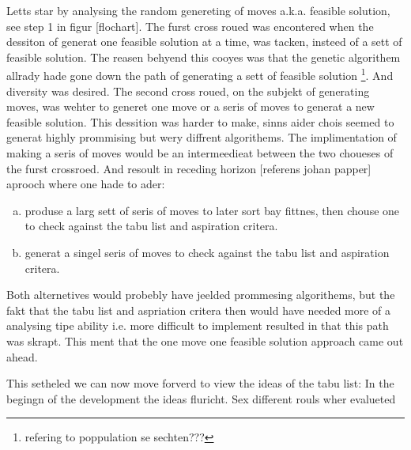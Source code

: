 Letts star by analysing the random genereting of moves a.k.a. feasible solution, see step 1 in figur [flochart].
The furst cross roued was encontered when the dessiton of generat one feasible solution at a time, was tacken, insteed of a sett of feasible solution. The reasen behyend this cooyes was that the genetic algorithem allrady hade gone down the path of generating a sett of feasible solution \footnote{ refering to poppulation se sechten???}. And diversity was desired.
The second cross roued, on the subjekt of generating moves, was wehter to generet one move or a seris of moves to generat a new feasible solution. This dessition was harder to make, sinns aider chois seemed to generat highly prommising but wery diffrent algorithems. The implimentation of making a seris of moves would be an intermeedieat between the two choueses of the furst crossroed. And resoult in receding horizon [referens johan papper] aprooch where one hade to ader: 
\begin{enumerate}[(a)]   
\item produse a larg sett of seris of moves to later sort bay fittnes, then chouse one to check against the tabu list and aspiration critera.
\item generat a singel seris of moves to check against the tabu list and aspiration critera.
\end{enumerate}
Both alternetives would probebly have jeelded prommesing algorithems, but the fakt that the tabu list and aspriation critera then would have needed more of a analysing tipe ability i.e. more difficult to implement resulted in that this path was skrapt. This ment that the one move one feasible solution approach came out ahead.

This setheled we can now move forverd to view the ideas of the tabu list:
In the begingn of the development the ideas fluricht. Sex different rouls wher evalueted   

